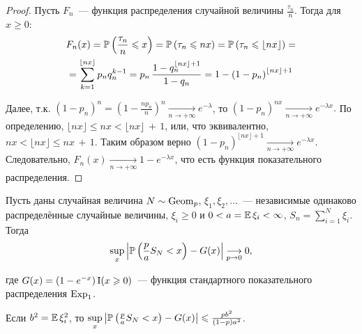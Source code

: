 \begin{proof}
    Пусть $F_n$~--- функция распределения случайной величины $\frac{\tau_n}{n}$.
    Тогда для $x \geqslant 0$:
    \begin{multline*}        
        F_{n}(x)=\operatorname{\mathbb{P}}\left(\frac{\tau_{n}}{n} \leqslant x\right)=
        \operatorname{\mathbb{P}}\left(\tau_{n} \leqslant n x\right) = 
        \operatorname{\mathbb{P}}\left(\tau_{n} \leqslant \lfloor n x\rfloor\right) = \\
        = \sum\limits_{k = 1}^{\lfloor nx \rfloor} p_n q_n^{k-1} = 
        p_n \, \frac{1 - q_n^{\lfloor nx \rfloor + 1}} {1-q_n} = 
        1-\left(1-p_{n}\right)^{\lfloor nx \rfloor + 1}
    \end{multline*}
    
    Далее, т.к. $\left(1-p_{n}\right)^{n}=\left(1-\frac{n p_{n}}{n}\right)^{n} \xrightarrow[n \to +\infty]{} e^{-\lambda}$, 
    то $(1 - p_n)^{nx} \xrightarrow[n \to +\infty]{} e^{-\lambda x}.$ 
    По определению, $\lfloor n x\rfloor \leqslant n x<\lfloor n x\rfloor\,+\,1$, 
    или, что эквивалентно, $nx < \lfloor nx \rfloor \leqslant nx\,+\,1$. 
    Таким образом верно $(1 - p_n)^{\lfloor nx \rfloor + 1} \xrightarrow[n \to +\infty]{} e^{-\lambda x}$. 
    Следовательно, $F_n(x) \xrightarrow[n \to +\infty]{} 1 - e^{-\lambda x}$, что есть функция показательного распределения. 
\end{proof}



\begin{namedthm}
Пусть даны случайная величина $N \sim \operatorname{\mathrm{Geom}}_{p}$, $\xi_1, \xi_2, \ldots$~--- независимые одинаково распределённые случайные величины, 
$\xi_i \geqslant 0$ и $0 < a = \operatorname{\mathbb{E}} \xi_i < \infty$, $S_n = \sum\limits_{i=1}^N \xi_i$. Тогда
\begin{equation*}
    \sup\limits_{x}\left|\operatorname{\mathbb{P}}\left(\frac{p}{a} S_{N}<x\right)-G(x)\right| \underset{p \to 0}{\longrightarrow} 0,
\end{equation*}

где $G(x)=\left(1-e^{-x}\right) \operatorname{\mathrm{I}}(x \geqslant 0)$~--- функция стандартного показательного распределения $\operatorname{\mathrm{Exp}}_{1}$.

Если $b^2 = \operatorname{\mathbb{E}} \xi_i^2$, то $\sup\limits_{x}\left|\operatorname{\mathbb{P}}\left(\frac{p}{a} S_{N}<x\right)-G(x)\right| \leqslant \frac{p b^{2}}{(1-p) a^{2}}$.
\end{namedthm}
